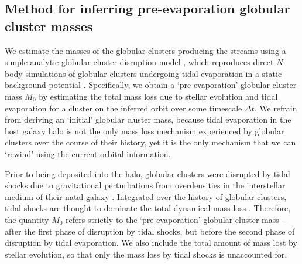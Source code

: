 \documentclass[twocolumn]{aastex63}
\begin{document}
\subsection{Method for inferring pre-evaporation globular cluster masses}
We estimate the masses of the globular clusters producing the streams using a simple analytic globular cluster disruption model \citep{lamers05}, which reproduces direct $N$-body simulations of globular clusters undergoing tidal evaporation in a static background potential \citep{baumgardt03}. Specifically, we obtain a `pre-evaporation' globular cluster mass $M_0$ by estimating the total mass loss due to stellar evolution and tidal evaporation for a cluster on the inferred orbit over some timescale $\Delta t$. We refrain from deriving an `initial' globular cluster mass, because tidal evaporation in the host galaxy halo is not the only mass loss mechanism experienced by globular clusters over the course of their history, yet it is the only mechanism that we can `rewind' using the current orbital information.

Prior to being deposited into the halo, globular clusters were disrupted by tidal shocks due to gravitational perturbations from overdensities in the interstellar medium of their natal galaxy \citep[e.g.][]{gieles06,elmegreen:2010b,kruijssen11,miholics17,pfeffer:2018}. Integrated over the history of globular clusters, tidal shocks are thought to dominate the total dynamical mass loss \citep[e.g.][]{kruijssen15b}. Therefore, the quantity $M_0$ refers strictly to the `pre-evaporation' globular cluster mass -- after the first phase of disruption by tidal shocks, but before the second phase of disruption by tidal evaporation. We also include the total amount of mass lost by stellar evolution, so that only the mass loss by tidal shocks is unaccounted for.
\end{document}
